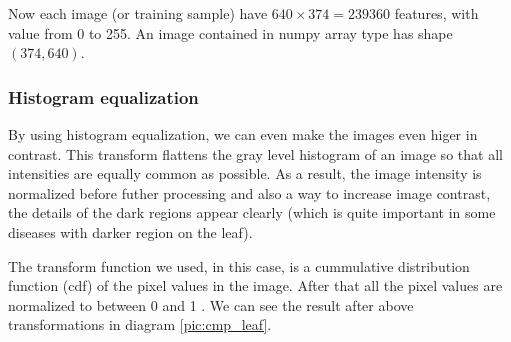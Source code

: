 \documentclass[12pt, a4paper]{article}
\begin{document}
	Now each image (or training sample) have $640 \times 374 = 239360$ features, with value from 0 to 255. An image contained in numpy array type has shape $(374, 640)$.
	
	\subsubsection{Histogram equalization}
	
	By using histogram equalization, we can even make the images even higer in contrast. This transform flattens the gray level histogram of an image so that all intensities are equally common as possible. As a result, the image intensity is normalized before futher processing and also a way to increase image contrast, the details of the dark regions appear clearly (which is quite important in some diseases with darker region on the leaf). 
	
	The transform function we used, in this case, is a cummulative distribution function (cdf) of the pixel values in the image. After that all the pixel values are normalized to between 0 and 1 \cite{Solem2012}. We can see the result after above transformations in diagram \ref{pic:cmp_leaf}.
	
\end{document}
